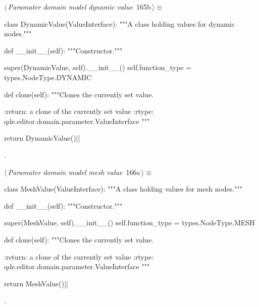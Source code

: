 \documentclass[%
    a4paper,    %
    justified,  %
    nobib,      %
    openany     %
]{tufte-book}
\begin{document}
\begin{flushleft} \small
\begin{minipage}{\linewidth}\label{scrap184}\raggedright\small
{} $\langle\,${\itshape Paramater domain model dynamic value}\nobreak\ {\footnotesize {165b}}$\,\rangle\equiv$
\vspace{-1ex}
\begin{pythoncode}
class DynamicValue(ValueInterface):
    """A class holding values for dynamic nodes."""

    def __init__(self):
        """Constructor."""

        super(DynamicValue, self).__init__()
        self.function_type = types.NodeType.DYNAMIC

    def clone(self):
        """Clones the currently set value.

        :return: a clone of the currently set value
        :rtype:  qde.editor.domain.parameter.ValueInterface
        """

        return DynamicValue()|\NWsep|
\end{pythoncode}
\vspace{1.5ex}
\footnotesize
\begin{list}{}{\setlength{\itemsep}{-\parsep}\setlength{\itemindent}{-\leftmargin}}
\item {\NWtxtMacroNoRef}.

\item{}
\end{list}
\end{minipage}\vspace{4ex}
\end{flushleft}
\begin{flushleft} \small
\begin{minipage}{\linewidth}\label{scrap185}\raggedright\small
{} $\langle\,${\itshape Paramater domain model mesh value}\nobreak\ {\footnotesize {166a}}$\,\rangle\equiv$
\vspace{-1ex}
\begin{pythoncode}
class MeshValue(ValueInterface):
    """A class holding values for mesh nodes."""

    def __init__(self):
        """Constructor."""

        super(MeshValue, self).__init__()
        self.function_type = types.NodeType.MESH

    def clone(self):
        """Clones the currently set value.

        :return: a clone of the currently set value
        :rtype:  qde.editor.domain.parameter.ValueInterface
        """

        return MeshValue()|\NWsep|
\end{pythoncode}
\vspace{1.5ex}
\footnotesize
\begin{list}{}{\setlength{\itemsep}{-\parsep}\setlength{\itemindent}{-\leftmargin}}
\item {\NWtxtMacroNoRef}.

\item{}
\end{list}
\end{minipage}\vspace{4ex}
\end{flushleft}
\end{document}
